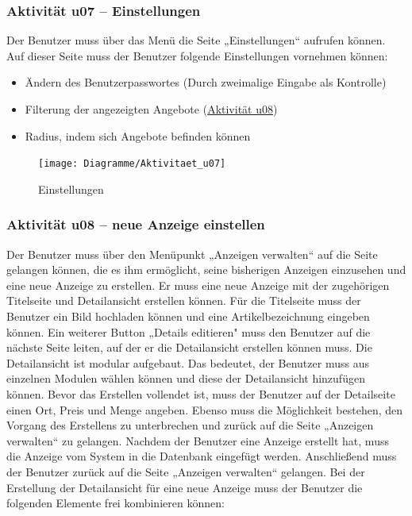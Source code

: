 \documentclass[a4paper,12pt,oneside]{scrartcl}
\begin{document}
\subsubsection{Aktivität u07 – Einstellungen}
Der Benutzer muss über das Menü die Seite „Einstellungen“ aufrufen können.
Auf dieser Seite muss der Benutzer folgende Einstellungen vornehmen können:
\begin{itemize}
	\item Ändern des Benutzerpasswortes (Durch zweimalige Eingabe als Kontrolle)
	\item Filterung der angezeigten Angebote (\hyperlink{u08}{Aktivität u08})
	\item Radius, indem sich Angebote befinden können
\end{itemize}

\begin{figure}[!htbp]
\centering
\noindent\texttt{[image: Diagramme/Aktivitaet\_u07]}
\caption{Einstellungen}
\end{figure}
\FloatBarrier


\hypertarget{u08}{\subsubsection{Aktivität u08 – neue Anzeige einstellen}}
Der Benutzer muss über den Menüpunkt „Anzeigen verwalten“ auf die Seite gelangen können, die es ihm ermöglicht, seine bisherigen Anzeigen einzusehen und eine neue Anzeige zu erstellen. 
Er muss eine neue Anzeige mit der zugehörigen Titelseite und Detailansicht erstellen können.
Für die Titelseite muss der Benutzer ein Bild hochladen können und eine Artikelbezeichnung eingeben können. 
Ein weiterer Button „Details editieren" muss den Benutzer auf die nächste Seite leiten, auf der er die Detailansicht erstellen können muss. 
Die Detailansicht ist modular aufgebaut. Das bedeutet, der Benutzer muss aus einzelnen Modulen wählen können und diese der Detailansicht hinzufügen können.
Bevor das Erstellen vollendet ist, muss der Benutzer auf der Detailseite einen Ort, Preis und Menge angeben.
Ebenso muss die Möglichkeit bestehen, den Vorgang des Erstellens zu unterbrechen und zurück auf die Seite „Anzeigen verwalten“ zu gelangen.
Nachdem der Benutzer eine Anzeige erstellt hat, muss die Anzeige vom System in die Datenbank eingefügt werden.
Anschließend muss der Benutzer zurück auf die Seite „Anzeigen verwalten“ gelangen. 
Bei der Erstellung der Detailansicht für eine neue Anzeige muss der Benutzer die folgenden Elemente frei kombinieren können:
\end{document}

